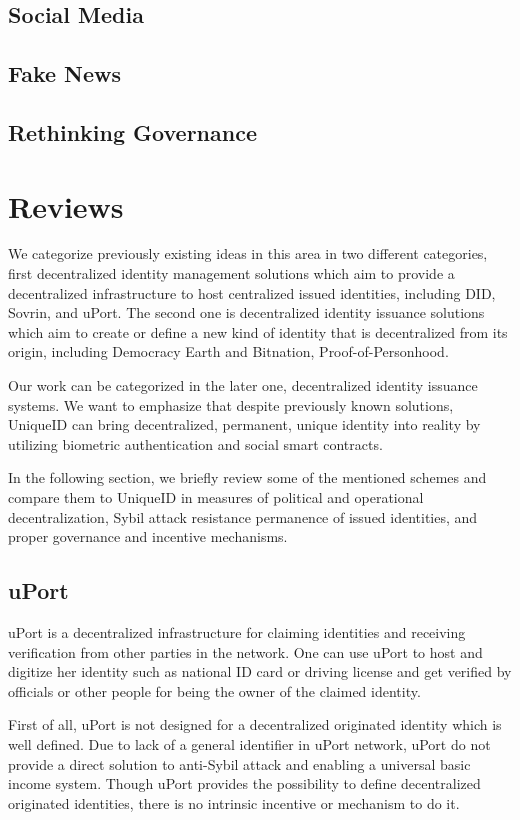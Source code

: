 \documentclass[conference]{IEEEtran}
\begin{document}
\subsection{Social Media}
\subsection{Fake News}
\subsection{Rethinking Governance}

\section{Reviews}
We categorize previously existing ideas in this area in two different categories, first decentralized identity management solutions which aim to provide a decentralized infrastructure to host centralized issued identities, including DID, Sovrin, and uPort. The second one is decentralized identity issuance solutions which aim to create or define a new kind of identity that is decentralized from its origin, including Democracy Earth and Bitnation, Proof-of-Personhood.


Our work can be categorized in the later one, decentralized identity issuance systems. We want to emphasize that despite previously known solutions, UniqueID can bring decentralized, permanent, unique identity into reality by utilizing biometric authentication and social smart contracts. 


In the following section, we briefly review some of the mentioned schemes and compare them to UniqueID in measures of political and operational decentralization, Sybil attack resistance  permanence of issued identities, and proper governance and incentive mechanisms. 

\subsection{uPort}

uPort is a decentralized infrastructure for claiming identities and receiving verification from other parties in the network. One can use uPort to host and digitize her identity such as national ID card or driving license and get verified by officials or other people for being the owner of the claimed identity.


 First of all, uPort is not designed for a decentralized originated identity which is well defined. Due to lack of a general identifier in uPort network, uPort do not provide a direct solution to anti-Sybil attack and enabling a universal basic income system. Though uPort provides the possibility to define decentralized originated identities, there is no intrinsic incentive or mechanism to do it.
\end{document}
